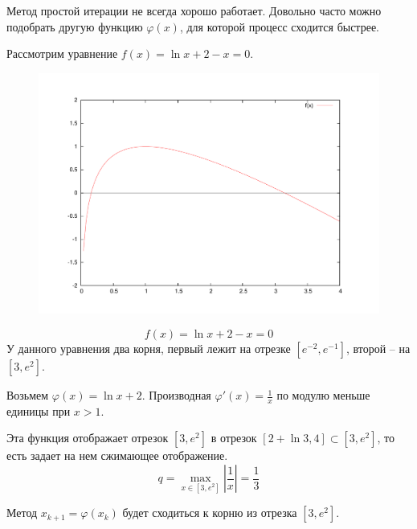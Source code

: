 \documentclass[professionalfonts,compress,unicode]{beamer}
\begin{document}
{
	Метод простой итерации не всегда хорошо работает. Довольно часто можно
	подобрать другую функцию $\varphi(x)$, для которой процесс сходится быстрее.
	
	Рассмотрим уравнение $f(x) = \ln x + 2 - x = 0$. 
	\begin{figure}%
	\includegraphics[height=0.6\textheight]{lnxmxp2.pdf}%
	\end{figure}
}

{
	$$f(x) = \ln x + 2 - x = 0$$
	У данного уравнения два корня, первый лежит на отрезке $[e^{-2},e^{-1}]$, второй -- на $[3,e^2]$.
	\pause
	
	Возьмем $\varphi(x) = \ln x + 2$. Производная $\varphi'(x) = \frac{1}{x}$ по модулю меньше единицы при $x > 1$. 
	
	Эта функция отображает отрезок $[3, e^2]$ в отрезок $[2 + \ln 3, 4] \subset [3,e^2]$, то есть задает на нем сжимающее отображение.
	$$
	q = \max_{x\in[3,e^2]} \left|\frac{1}{x}\right| = \frac{1}{3}
	$$
	
	Метод $x_{k+1} = \varphi(x_k)$ будет сходиться к корню из отрезка $[3,e^2]$.
}
\end{document}
